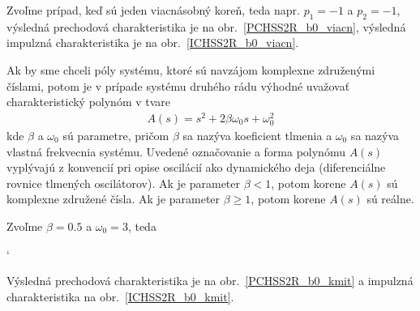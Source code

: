 \documentclass[a4paper, 10pt, ]{article}
\begin{document}
Zvoľme prípad, keď sú jeden viacnásobný koreň, teda napr. $p_1 = -1$ a $p_2 = -1$, výsledná prechodová charakteristika je na obr.~\ref{PCHSS2R_b0_viacn}, výsledná impulzná charakteristika je na obr.~\ref{ICHSS2R_b0_viacn}.

\begin{center}


	\label{PCHSS2R_b0_viacn}

\end{center}

\begin{center}


	\label{ICHSS2R_b0_viacn}

\end{center}


Ak by sme chceli póly systému, ktoré sú navzájom komplexne združenými číslami, potom je v prípade systému druhého rádu výhodné uvažovať charakteristický polynóm v tvare
\begin{align}
    A(s) = s^2 + 2 \beta \omega_0 s + \omega_0^2
\end{align}
kde $\beta$ a $\omega_0$ sú parametre, pričom $\beta$ sa nazýva koeficient tlmenia a $\omega_0$ sa nazýva vlastná frekvecnia systému. Uvedené označovanie a forma polynómu $A(s)$ vyplývajú z konvencií pri opise oscilácií ako dynamického deja (diferenciálne rovnice tlmených oscilátorov). Ak je parameter $\beta < 1$, potom korene $A(s)$ sú komplexne združené čísla. Ak je parameter $\beta \geq 1$, potom korene $A(s)$ sú reálne.

Zvoľme $\beta = 0.5$ a $\omega_0 = 3$, teda
{\catcode`

}
\noindent
Výsledná prechodová charakteristika je na obr.~\ref{PCHSS2R_b0_kmit} a impulzná charakteristika na obr.~\ref{ICHSS2R_b0_kmit}.


\begin{center}


	\label{PCHSS2R_b0_kmit}

\end{center}
\end{document}
